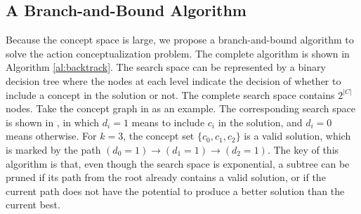 %
%

\subsection{A Branch-and-Bound Algorithm}
Because the concept space is large,
we propose a branch-and-bound algorithm to solve the
action conceptualization problem.
The complete algorithm is shown in Algorithm \ref{al:backtrack}.
The search space can be represented by a binary decision tree
where the nodes at each level indicate the decision of whether to include a concept in
the solution or not. The complete search space contains $2^{|C|}$ nodes.
Take the concept graph in  as an example.
The corresponding search space is shown in ,
in which $d_i=1$ means to include $c_i$ in the solution, and $d_i=0$ means
otherwise. For $k=3$, the concept set $\{c_0,c_1,c_2\}$ is
a valid solution, which is marked by the path
$(d_0=1) \rightarrow (d_1=1) \rightarrow (d_2=1)$. The key of this algorithm
is that, even though the search space is exponential, a subtree can be
pruned if its path from the root already contains a valid solution, or
if the current path does not have the potential to produce a better solution
than the current best.

